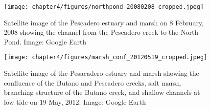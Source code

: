 \begin{figure}
\centering
	\texttt{[image: chapter4/figures/northpond\_20080208\_cropped.jpeg]}
	\caption{Satellite image of the Pescadero estuary and marsh on 8 February, 2008 showing the channel from the Pescadero creek to the North Pond. Image: Google Earth} \label{fig:geNP}
\end{figure}


\begin{figure}
\centering
	\texttt{[image: chapter4/figures/marsh\_conf\_20120519\_cropped.jpeg]}
	\caption{Satellite image of the Pesacadero estuary and marsh showing the confluence of the Butano and Pescadero creeks, salt marsh, branching structure of the Butano creek, and shallow channels at low tide on 19 May, 2012. Image: Google Earth} \label{fig:geMarsh}
\end{figure}
